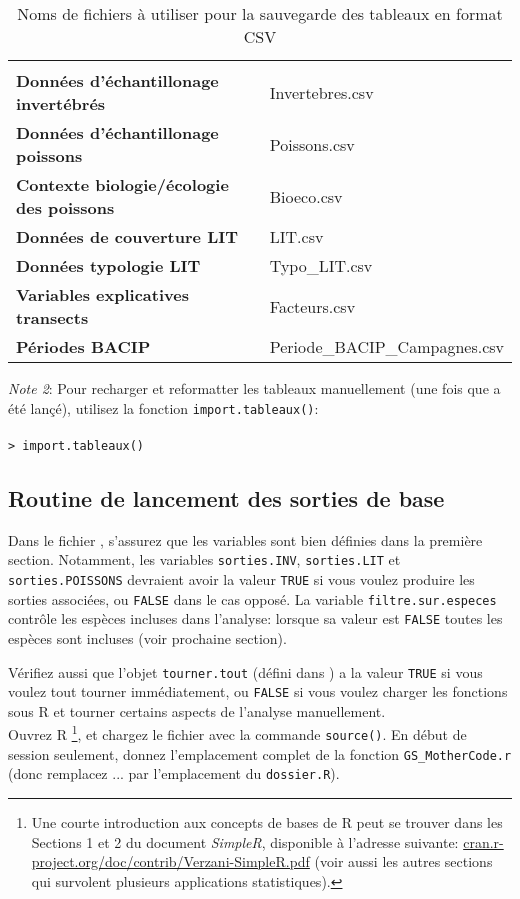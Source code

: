 \documentclass{article}
\begin{document}
\begin{table}[h]
\caption{ Noms de fichiers à utiliser pour la sauvegarde des tableaux
  en format CSV   \label{tableaucsv}}
\begin{center}
\begin{tabular}{l l}
\hline
\hline
\\
\textbf{Données d'échantillonage invertébrés} & Invertebres.csv \\
\textbf{Données d'échantillonage poissons} & Poissons.csv \\
\textbf{Contexte biologie/écologie des poissons} & Bioeco.csv \\
\textbf{Données de couverture LIT} & LIT.csv \\
\textbf{Données typologie LIT} & Typo\_LIT.csv \\
\textbf{Variables explicatives transects} & Facteurs.csv \\
\textbf{Périodes BACIP} & Periode\_BACIP\_Campagnes.csv \\
\end{tabular}
\end{center}
\end{table}

\emph{Note 2}: Pour recharger et reformatter les tableaux manuellement
(une fois que \mcode a été lançé), utilisez la fonction \texttt{import.tableaux()}: \\
\\
\texttt{> import.tableaux()}\\

   \subsection*{Routine de lancement des sorties de base}

   Dans le fichier \mcode, s'assurez que les variables sont bien définies dans
   la première section. Notamment, les variables
   \texttt{sorties.INV}, \texttt{sorties.LIT} et
   \texttt{sorties.POISSONS} devraient avoir la valeur \texttt{TRUE} si vous
   voulez produire les sorties associées, ou \texttt{FALSE} dans le
   cas opposé. La variable \texttt{filtre.sur.especes} contrôle les
   espèces incluses dans l'analyse: lorsque sa valeur est
   \texttt{FALSE} toutes les espèces sont incluses (voir prochaine
   section).

  Vérifiez aussi que l'objet \texttt{tourner.tout} (défini dans \mcode) a la valeur \texttt{TRUE} si vous voulez
tout tourner immédiatement, ou \texttt{FALSE} si vous voulez
charger les fonctions sous R et tourner certains
aspects de l'analyse manuellement.
\\
Ouvrez R \footnote{Une courte introduction aux concepts de bases de R peut
  se trouver dans les Sections 1 et 2 du document \emph{SimpleR}, disponible
  à l'adresse suivante:
  \url{cran.r-project.org/doc/contrib/Verzani-SimpleR.pdf} (voir aussi
  les autres sections qui survolent plusieurs applications
  statistiques).}, et chargez le fichier \mcode {} avec la commande
\texttt{source()}.
  En début de session seulement, donnez
  l'emplacement complet de la fonction \texttt{GS\_MotherCode.r} (donc
  remplacez ... par l'emplacement du \texttt{dossier.R}).
\end{document}

